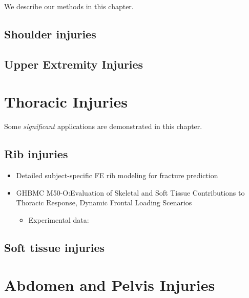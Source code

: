 \documentclass[]{book}
\providecommand{\tightlist}{%
  \setlength{\itemsep}{0pt}\setlength{\parskip}{0pt}}
\begin{document}
We describe our methods in this chapter.

\hypertarget{shoulder-injuries-1}{%
\section{Shoulder injuries}\label{shoulder-injuries-1}}

\hypertarget{upper-extremity-injuries-1}{%
\section{Upper Extremity Injuries}\label{upper-extremity-injuries-1}}

\hypertarget{thoracic-injuries-1}{%
\chapter{Thoracic Injuries}\label{thoracic-injuries-1}}

Some \emph{significant} applications are demonstrated in this chapter.

\hypertarget{rib-injuries-1}{%
\section{Rib injuries}\label{rib-injuries-1}}

\begin{itemize}
\item
  Detailed subject-specific FE rib modeling for fracture prediction \citep{Iraeus2019}
\item
  GHBMC M50-O:Evaluation of Skeletal and Soft Tissue Contributions to Thoracic Response, Dynamic Frontal Loading Scenarios \citep{Ramachandra2019}

  \begin{itemize}
  \tightlist
  \item
    Experimental data: \citep{Murach2018}
  \end{itemize}
\end{itemize}

\hypertarget{soft-tissue-injuries-1}{%
\section{Soft tissue injuries}\label{soft-tissue-injuries-1}}

\hypertarget{abdomen-and-pelvis-injuries-1}{%
\chapter{Abdomen and Pelvis Injuries}\label{abdomen-and-pelvis-injuries-1}}
\end{document}
